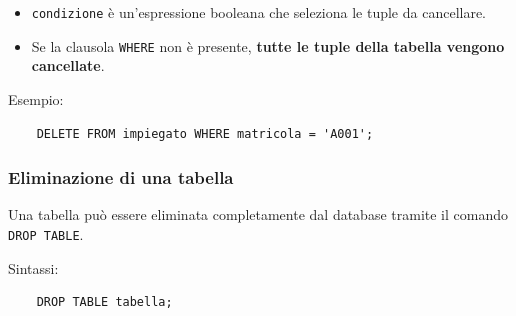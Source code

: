 \begin{itemize}
	
	\item \texttt{condizione} è un'espressione booleana che seleziona
	le tuple da cancellare.
	
	\item Se la clausola \texttt{WHERE} non è presente,
	\textbf{tutte le tuple della tabella vengono cancellate}.
	
\end{itemize}

Esempio:

\begin{verbatim}
	DELETE FROM impiegato WHERE matricola = 'A001';
\end{verbatim}

\subsubsection{Eliminazione di una tabella}

Una tabella può essere eliminata completamente dal database tramite
il comando \texttt{DROP TABLE}.

Sintassi:

\begin{verbatim}
	DROP TABLE tabella;
\end{verbatim}
